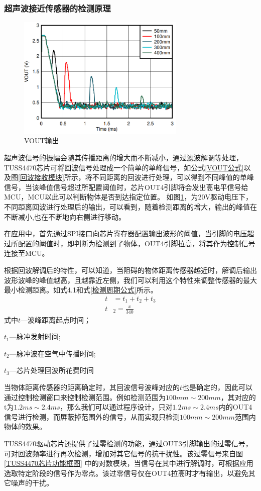     \subsubsection{超声波接近传感器的检测原理}
    \begin{figure}[!h]
    	\centering
    	\includegraphics[width=8cm]{figure/VOUT image.png}
    	\caption{VOUT输出}
    	\label{VOUT输出}
    \end{figure}\par
    超声波信号的振幅会随其传播距离的增大而不断减小，通过滤波解调等处理，TUSS4470芯片可将回波信号处理成一个简单的单峰信号，如公式\ref{VOUT公式}以及图\ref{回波接收模块}所示，将不同距离的回波进行处理，可以得到不同峰值的单峰信号，当该峰值信号超过所配置阈值时，芯片OUT4引脚将会发出高电平信号给MCU，MCU以此可以判断物体是否到达指定位置。
    如图\ref{VOUT输出}，为20V驱动电压下，不同距离回波进行处理后的输出，可以看到，随着检测距离的增大，输出的峰值在不断减小,也在不断地向右侧进行移动。\par
    在应用中，首先通过SPI接口向芯片寄存器配置输出波形的阈值，当引脚的电压超过所配置的阈值时，即判断为检测到了物体，OUT4引脚拉高，将其作为控制信号连接至MCU。\par
    根据回波解调后的特性，可以知道，当阻碍的物体距离传感器越近时，解调后输出波形波峰的峰值越高，且越靠近左侧，我们可以利用这个特性来调整传感器的最大最小检测距离。如式4.1和式\ref{检测周期公式}所示。
    \begin{align}
    	t&=t_1+t_2+t_3 \\
    	t&_2=\frac{x}{340}
    	\label{检测周期公式}
    \end{align}  
式中\quad$t$---波峰距离起点时间；\par
    \quad$t_1$---脉冲发射时间;\par
    \quad$t_2$---脉冲波在空气中传播时间;\par
    \quad$t_3$---芯片处理回波所花费时间\par         
    当物体距离传感器的距离确定时，其回波信号波峰对应的$t$也是确定的，因此可以通过控制检测窗口来控制检测范围。例如检测范围为$100mm\sim200mm$，其对应的t为$1.2ms\sim2.4ms$，那么我们可以通过程序设计，只对$1.2ms\sim2.4ms$内的OUT4信号进行检测，而屏蔽掉范围外的信号，从而实现只检测$100mm\sim200mm$范围内物体的效果。\par
    TUSS4470驱动芯片还提供了过零检测的功能，通过OUT3引脚输出的过零信号，可对回波频率进行再次检测，增加对其它信号的抗干扰性。该过零信号来自图\ref{TUSS4470芯片功能框图}
    中的对数模块，当信号在其中进行解调时，可根据应用选取特定阶段的信号作为零点。该过零信号仅在OUT4拉高时才有输出，以避免其它噪声的干扰。
